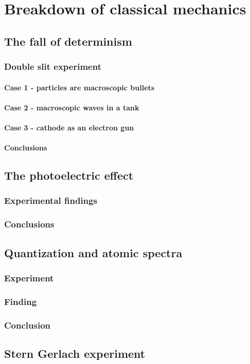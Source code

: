 \chapter{Breakdown of classical mechanics}

\section{The fall of determinism}

  \subsection{Double slit experiment}

    \subsubsection{Case 1 - particles are macroscopic bullets}

    \subsubsection{Case 2 - macroscopic waves in a tank}

    \subsubsection{Case 3 - cathode as an electron gun}

    \subsubsection{Conclusions}

\section{The photoelectric effect}

  \subsection{Experimental findings}

  \subsection{Conclusions}

\section{Quantization and atomic spectra}

  \subsection{Experiment}

  \subsection{Finding}

  \subsection{Conclusion}

\section{Stern Gerlach experiment}


